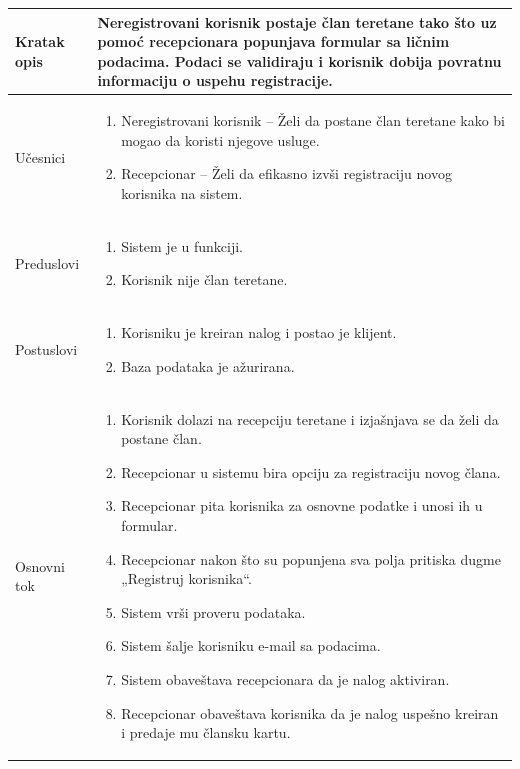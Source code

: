 \documentclass[../main.tex]{subfiles}
\begin{document}
\begin{longtable}{| p{} | p{} |} 
\hline
    Kratak opis &  Neregistrovani korisnik postaje član teretane tako što uz pomoć recepcionara popunjava formular sa ličnim podacima. Podaci se validiraju i korisnik dobija povratnu informaciju o uspehu registracije.\\ 
\hline    
    Učesnici & \begin{enumerate}
        \item Neregistrovani korisnik – Želi da postane član teretane kako bi mogao da koristi njegove usluge.
        \item Recepcionar – Želi da efikasno izvši registraciju novog korisnika na sistem.
     \end{enumerate}\\
\hline
   Preduslovi & \begin{enumerate}
       \item Sistem je u funkciji.
       \item Korisnik nije član teretane.
   \end{enumerate}\\
\hline  
    Postuslovi & \begin{enumerate}
        \item Korisniku je kreiran nalog i postao je klijent.
        \item Baza podataka je ažurirana.
    \end{enumerate}\\
\hline
    Osnovni tok & \begin{enumerate}
        \item Korisnik dolazi na recepciju teretane i izjašnjava se da želi da postane član.
        \item Recepcionar u sistemu bira opciju za registraciju novog člana.
        \item Recepcionar pita korisnika za osnovne podatke i unosi ih u formular.
        \item Recepcionar nakon što su popunjena sva polja pritiska dugme „Registruj korisnika“.
        \item Sistem vrši proveru podataka.
        \item Sistem šalje korisniku e-mail sa podacima.
        \item Sistem obaveštava recepcionara da je nalog aktiviran.
        \item Recepcionar obaveštava korisnika da je nalog uspešno kreiran i predaje mu člansku kartu.

\end{enumerate}
\end{longtable}
\end{document}
